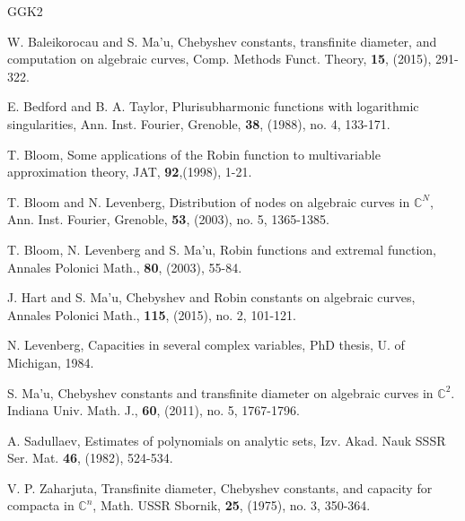 \documentclass[12pt]{article}
\numberwithin{equation}{section}
\newcommand{\C}{\mathbb{C}}
\begin{document}
\begin{thebibliography}{GGK2}

 W. Baleikorocau and S. Ma'u, Chebyshev constants, transfinite diameter, and computation on algebraic curves, Comp. Methods Funct. Theory, \textbf{15}, (2015), 291-322.
 
  E. Bedford and B. A. Taylor, Plurisubharmonic functions with logarithmic singularities, Ann. Inst. Fourier, Grenoble, \textbf{38}, (1988), no. 4, 133-171.
 
  T. Bloom, Some applications of the Robin function to multivariable approximation theory, JAT,  \textbf{92},(1998), 1-21.
 
  T. Bloom and N. Levenberg, Distribution of nodes on algebraic curves in $\C^N$, Ann. Inst. Fourier, Grenoble, \textbf{53}, (2003), no. 5, 1365-1385.
 
  T. Bloom, N. Levenberg and S. Ma'u, Robin functions and extremal function,  Annales Polonici Math., \textbf{80}, (2003), 55-84.
 
  J. Hart and S. Ma'u, Chebyshev and Robin constants on algebraic curves, Annales Polonici Math., \textbf{115}, (2015), no. 2, 101-121.
 
  N. Levenberg, Capacities in several complex variables, PhD thesis, U. of Michigan, 1984.
 
  S. Ma'u, Chebyshev constants and transfinite diameter on algebraic curves in $\C^2$. Indiana Univ. Math. J., \textbf{60}, (2011), no. 5, 1767-1796.
 
  A. Sadullaev, Estimates of polynomials on analytic sets, Izv. Akad. Nauk SSSR Ser. Mat. \textbf{46}, (1982), 524-534. 
 
  V. P. Zaharjuta, Transfinite diameter, Chebyshev constants, and capacity for compacta in $\C^n$, Math. USSR Sbornik, \textbf{25}, (1975), no. 3, 350-364. 
 
 
\end{thebibliography}
\end{document}
